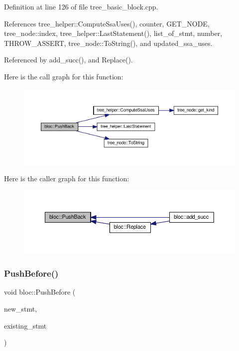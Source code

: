 Definition at line 126 of file tree\+\_\+basic\+\_\+block.\+cpp.



References tree\+\_\+helper\+::\+Compute\+Ssa\+Uses(), counter, G\+E\+T\+\_\+\+N\+O\+DE, tree\+\_\+node\+::index, tree\+\_\+helper\+::\+Last\+Statement(), list\+\_\+of\+\_\+stmt, number, T\+H\+R\+O\+W\+\_\+\+A\+S\+S\+E\+RT, tree\+\_\+node\+::\+To\+String(), and updated\+\_\+ssa\+\_\+uses.



Referenced by add\+\_\+succ(), and Replace().

Here is the call graph for this function\+:
\nopagebreak
\begin{figure}[H]
\begin{center}
\leavevmode
\includegraphics[width=350pt]{d6/df6/structbloc_ae5b558b58df6da7f27f07bc64eac9c68_cgraph}
\end{center}
\end{figure}
Here is the caller graph for this function\+:
\nopagebreak
\begin{figure}[H]
\begin{center}
\leavevmode
\includegraphics[width=350pt]{d6/df6/structbloc_ae5b558b58df6da7f27f07bc64eac9c68_icgraph}
\end{center}
\end{figure}
\mbox{\label{structbloc_a3ac7907a4422bb34f52206b6db4bf22f}} 
\subsubsection{\texorpdfstring{Push\+Before()}{PushBefore()}}
{\footnotesize\ttfamily void bloc\+::\+Push\+Before (\begin{DoxyParamCaption}\item[{const \hyperlink{tree__node_8hpp_a6ee377554d1c4871ad66a337eaa67fd5}{tree\+\_\+node\+Ref}}]{new\+\_\+stmt,  }\item[{const \hyperlink{tree__node_8hpp_a6ee377554d1c4871ad66a337eaa67fd5}{tree\+\_\+node\+Ref}}]{existing\+\_\+stmt }\end{DoxyParamCaption})}



